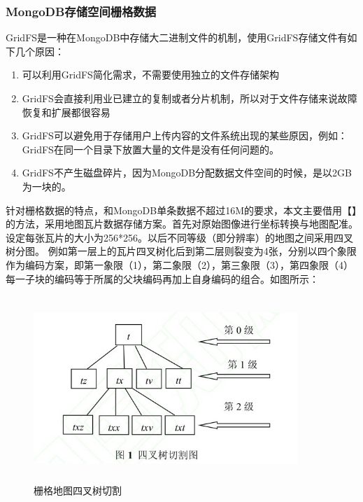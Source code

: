 \documentclass[master]{njnuthesis}
\begin{document}
\subsubsection{MongoDB存储空间栅格数据}
 GridFS是一种在MongoDB中存储大二进制文件的机制，使用GridFS存储文件有如下几个原因：
\begin{enumerate}
\item 可以利用GridFS简化需求，不需要使用独立的文件存储架构
\item GridFS会直接利用业已建立的复制或者分片机制，所以对于文件存储来说故障恢复和扩展都很容易
\item GridFS可以避免用于存储用户上传内容的文件系统出现的某些原因，例如：GridFS在同一个目录下放置大量的文件是没有任何问题的。
\item GridFS不产生磁盘碎片，因为MongoDB分配数据文件空间的时候，是以2GB为一块的。

\end{enumerate}
    针对栅格数据的特点，和MongoDB单条数据不超过16M的要求，本文主要借用【】的方法，采用地图瓦片数据存储方案。首先对原始图像进行坐标转换与地图配准。设定每张瓦片的大小为256*256。以后不同等级（即分辨率）的地图之间采用四叉树分图。
例如第一层上的瓦片四叉树化后到第二层则裂变为4张，分别以四个象限作为编码方案，即第一象限（1），第二象限（2），第三象限（3），第四象限（4）
每一子块的编码等于所属的父块编码再加上自身编码的组合。如图所示：

\begin{figure}[!htb]
\begin{center}
\includegraphics[angle=0,width=10cm,height=7cm]{pic//sichashu.jpg}
\caption{栅格地图四叉树切割}
\label{fig:2}
\end{center}
\end{figure}
\end{document}
